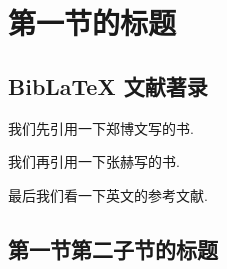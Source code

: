 
\section{第一节的标题}

\zhlipsum[1]

\subsection{BibLaTeX 文献著录}

\zhlipsum[1]

我们先引用一下郑博文写的书\cite{rudin1976principleschinese3}.

我们再引用一下张赫写的书\cite{rudin1976principleschinese}.

最后我们看一下英文的参考文献\cite{rudin1976principles}.

\subsection{第一节第二子节的标题}

\zhlipsum
